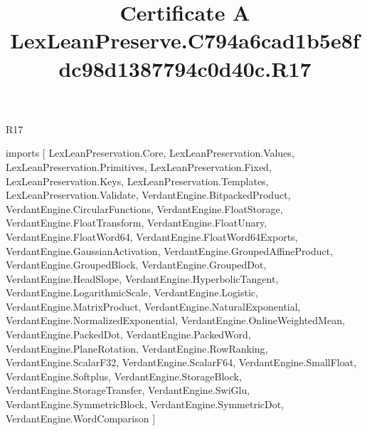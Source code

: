 \begin{lexlean}{R17}
\title{Certificate A LexLeanPreserve.C794a6cad1b5e8fdc98d1387794c0d40c.R17}
\begin{coremodule}
imports [
  LexLeanPreservation.Core,
  LexLeanPreservation.Values,
  LexLeanPreservation.Primitives,
  LexLeanPreservation.Fixed,
  LexLeanPreservation.Keys,
  LexLeanPreservation.Templates,
  LexLeanPreservation.Validate,
  VerdantEngine.BitpackedProduct,
  VerdantEngine.CircularFunctions,
  VerdantEngine.FloatStorage,
  VerdantEngine.FloatTransform,
  VerdantEngine.FloatUnary,
  VerdantEngine.FloatWord64,
  VerdantEngine.FloatWord64Exports,
  VerdantEngine.GaussianActivation,
  VerdantEngine.GroupedAffineProduct,
  VerdantEngine.GroupedBlock,
  VerdantEngine.GroupedDot,
  VerdantEngine.HeadSlope,
  VerdantEngine.HyperbolicTangent,
  VerdantEngine.LogarithmicScale,
  VerdantEngine.Logistic,
  VerdantEngine.MatrixProduct,
  VerdantEngine.NaturalExponential,
  VerdantEngine.NormalizedExponential,
  VerdantEngine.OnlineWeightedMean,
  VerdantEngine.PackedDot,
  VerdantEngine.PackedWord,
  VerdantEngine.PlaneRotation,
  VerdantEngine.RowRanking,
  VerdantEngine.ScalarF32,
  VerdantEngine.ScalarF64,
  VerdantEngine.SmallFloat,
  VerdantEngine.Softplus,
  VerdantEngine.StorageBlock,
  VerdantEngine.StorageTransfer,
  VerdantEngine.SwiGlu,
  VerdantEngine.SymmetricBlock,
  VerdantEngine.SymmetricDot,
  VerdantEngine.WordComparison
]


\end{coremodule}
\end{lexlean}
